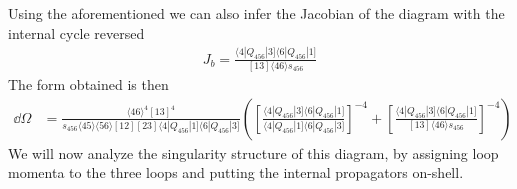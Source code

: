 \documentclass[letter,11pt]{article}
\newcommand{\ab}[1]{\langle #1 \rangle}
\newcommand{\sqb}[1]{[ #1 ]}
\newcommand{\aMs}[3]{\langle #1|#2|#3]}  		%
\begin{document}
Using the aforementioned we can also infer the Jacobian of the diagram with the internal cycle reversed
\begin{equation}
	\begin{aligned}
		J_b=\frac{\aMs{4}{Q_{456}}{3}\aMs{6}{Q_{456}}{1}}{[13]\ab{46}s_{456}}
	\end{aligned}
\end{equation}
The form obtained
is then
\begin{equation}
	\begin{aligned} \label{eq:6pt}
		\dd\Omega&=\frac{\ab{46}^4\sqb{13}^4}{s_{456}\ab{45}\ab{56}\sqb{12}\sqb{23}\aMs{4}{Q_{456}}{1}\aMs{6}{Q_{456}}{3}}\left(
		\left[\frac{\aMs{4}{Q_{456}}{3}\aMs{6}{Q_{456}}{1}}{\aMs{4}{Q_{456}}{1}\aMs{6}{Q_{456}}{3}}\right]^{-4}+\left[\frac{\aMs{4}{Q_{456}}{3}\aMs{6}{Q_{456}}{1}}{[13]\ab{46}s_{456}}\right]^{-4}
		\right)	
	\end{aligned}
\end{equation}
We will now analyze the singularity structure of this diagram, by assigning loop momenta to the three loops and putting the internal propagators on-shell.
\end{document}
